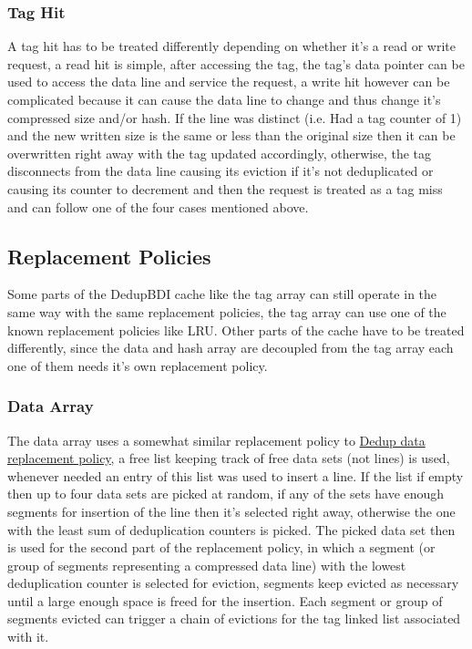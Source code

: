 \subsubsection{Tag Hit}
A tag hit has to be treated differently depending on whether it's a read or write request, a read hit is simple, after accessing the tag, the tag's data pointer can be used to access the data line and service the request, a write hit however can be complicated because it can cause the data line to change and thus change it's compressed size and/or hash. If the line was distinct (i.e. Had a tag counter of 1) and the new written size is the same or less than the original size then it can be overwritten right away with the tag updated accordingly, otherwise, the tag disconnects from the data line causing its eviction if it's not deduplicated or causing its counter to decrement and then the request is treated as a tag miss and can follow one of the four cases mentioned above.

\subsection{Replacement Policies}
\label{ssec:Replacement Policies}
Some parts of the DedupBDI cache like the tag array can still operate in the same way with the same replacement policies, the tag array can use one of the known replacement policies like LRU. Other parts of the cache have to be treated differently, since the data and hash array are decoupled from the tag array each one of them needs it's own replacement policy.
\subsubsection{Data Array}
\label{sssec:DedupBDIData}
The data array uses a somewhat similar replacement policy to \hyperref[sssec:DedupDataRepl]{Dedup data replacement policy}, a free list keeping track of free data sets (not lines) is used, whenever needed an entry of this list was used to insert a line. If the list if empty then up to four data sets are picked at random, if any of the sets have enough segments for insertion of the line then it's selected right away, otherwise the one with the least sum of deduplication counters is picked. The picked data set then is used for the second part of the replacement policy, in which a segment (or group of segments representing a compressed data line) with the lowest deduplication counter is selected for eviction, segments keep evicted as necessary until a large enough space is freed for the insertion. Each segment or group of segments evicted can trigger a chain of evictions for the tag linked list associated with it.
